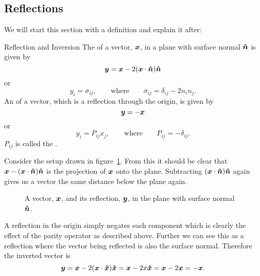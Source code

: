 \documentclass[a4paper]{article}
\begin{document}
    \subsection{Reflections}
    We will start this section with a definition and explain it after:
    \begin{definition}{Reflection and Inversion}{}
        The  of a vector, \(\bm{x}\), in a plane with surface normal \(\bm{\hat{n}}\) is given by
        \[\bm{y} = \bm{x} - 2(\bm{x}\cdot\bm{\hat{n}})\bm{\hat{n}}\]
        or
        \[y_i = \sigma_{ij}, \qquad\text{where}\qquad \sigma_{ij} = \delta_{ij} - 2n_in_j.\]
        An  of a vector, which is a reflection through the origin, is given by
        \[\bm{y} = -\bm{x}\]
        or
        \[y_i = P_{ij}x_j, \qquad\text{where}\qquad P_{ij} = -\delta_{ij}.\]
        \(P_{ij}\) is called the .
    \end{definition}
    Consider the setup drawn in figure~\ref{fig:reflected vector}.
    From this it should be clear that \(\bm{x} - (\bm{x}\cdot\bm{\hat{n}})\bm{\hat{n}}\) is the projection of \(\bm{x}\) onto the plane.
    Subtracting \((\bm{x}\cdot\bm{\hat{n}})\bm{\hat{n}}\) again gives us a vector the same distance below the plane again.
    \begin{figure}[ht]
        \centering
        \caption{A vector, \(\bm{x}\), and its reflection, \(\bm{y}\), in the plane with surface normal \(\bm{\hat{n}}\).}
        \label{fig:reflected vector}
    \end{figure}
    
    A reflection in the origin simply negates each component which is clearly the effect of the parity operator as described above.
    Further we can see this as a reflection where the vector being reflected is also the surface normal.
    Therefore the inverted vector is
    \[\bm{y} = \bm{x} - 2(\bm{x}\cdot\bm{\hat{x}})\bm{\hat{x}} = \bm{x} - 2x\bm{\hat{x}} = \bm{x} - 2\bm{x} = -\bm{x}.\]
    
\end{document}

